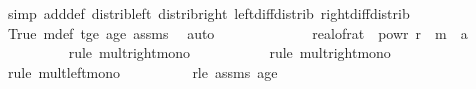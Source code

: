 \begin{isabellebody}
\ {\isacharparenleft}{\kern0pt}simp\ add{\isacharcolon}{\kern0pt}{\isasymdelta}{\isacharprime}{\kern0pt}{\isacharunderscore}{\kern0pt}def\ distrib{\isacharunderscore}{\kern0pt}left\ distrib{\isacharunderscore}{\kern0pt}right\ left{\isacharunderscore}{\kern0pt}diff{\isacharunderscore}{\kern0pt}distrib\ right{\isacharunderscore}{\kern0pt}diff{\isacharunderscore}{\kern0pt}distrib{\isacharparenright}{\kern0pt}\isanewline
\ \ \ \ \ \ \ \ \isamarkupfalse%
\ True\ m{\isacharunderscore}{\kern0pt}def\ t{\isacharunderscore}{\kern0pt}ge{\isacharunderscore}{\kern0pt}{}\ a{\isacharunderscore}{\kern0pt}ge{\isacharunderscore}{\kern0pt}{}\ assms{\isacharparenleft}{\kern0pt}{}{\isacharparenright}{\kern0pt}\ \isamarkupfalse%
\ auto\isanewline
\ \ \ \ \ \ \isamarkupfalse%
\ \isamarkupfalse%
\ {\isachardoublequoteopen}{\isachardot}{\kern0pt}{\isachardot}{\kern0pt}{\isachardot}{\kern0pt}\ {\isasymle}\ {\isacharparenleft}{\kern0pt}{\isacharparenleft}{\kern0pt}{}\ {\isacharplus}{\kern0pt}\ real{\isacharunderscore}{\kern0pt}of{\isacharunderscore}{\kern0pt}rat\ {\isasymdelta}{\isacharparenright}{\kern0pt}{\isacharasterisk}{\kern0pt}{\isacharparenleft}{\kern0pt}{}{\isacharminus}{\kern0pt}{}\ powr\ {\isacharparenleft}{\kern0pt}{\isacharminus}{\kern0pt}r{\isacharparenright}{\kern0pt}{\isacharparenright}{\kern0pt}{\isacharparenright}{\kern0pt}\ {\isacharasterisk}{\kern0pt}\ m\ {\isacharasterisk}{\kern0pt}\ {\isacharparenleft}{\kern0pt}a{\isacharplus}{\kern0pt}{}{\isacharparenright}{\kern0pt}{\isachardoublequoteclose}\isanewline
\ \ \ \ \ \ \ \ \isamarkupfalse%
\ {\isacharparenleft}{\kern0pt}rule\ mult{\isacharunderscore}{\kern0pt}right{\isacharunderscore}{\kern0pt}mono{\isacharparenright}{\kern0pt}\isanewline
\ \ \ \ \ \ \ \ \ \isamarkupfalse%
\ {\isacharparenleft}{\kern0pt}rule\ mult{\isacharunderscore}{\kern0pt}right{\isacharunderscore}{\kern0pt}mono{\isacharparenright}{\kern0pt}\isanewline
\ \ \ \ \ \ \ \ \ \ \isamarkupfalse%
\ {\isacharparenleft}{\kern0pt}rule\ mult{\isacharunderscore}{\kern0pt}left{\isacharunderscore}{\kern0pt}mono{\isacharparenright}{\kern0pt}\isanewline
\ \ \ \ \ \ \ \ \isamarkupfalse%
\ r{\isacharunderscore}{\kern0pt}le{\isacharunderscore}{\kern0pt}{\isasymdelta}\ assms{\isacharparenleft}{\kern0pt}{}{\isacharparenright}{\kern0pt}\ a{\isacharunderscore}{\kern0pt}ge{\isacharunderscore}{\kern0pt}{}\ \isamarkupfalse%

\end{isabellebody}
